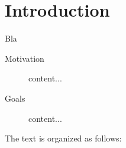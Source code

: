 \chapter{Introduction}
Bla \cite{arsanjani2004service} \cite{avivzienis2004basic} \cite{baldauf2007survey} \cite{barreradesign} \cite{dey2000providing} \cite{kian2010federated} \cite{knappmeyer2010contextml} \cite{skeen1981nonblocking} \cite{crippa2010}

\begin{description}
\item[Motivation]content...


\item[Goals]content...


\end{description}

The text is organized as follows: 